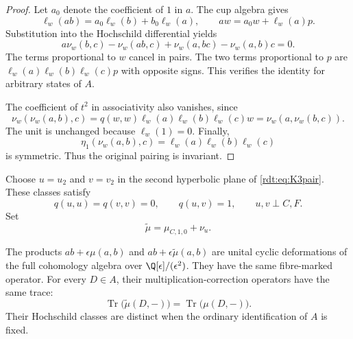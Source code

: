 \begin{proof}
Let $a_0$ denote the coefficient of $1$ in $a$.
The cup algebra gives
\[
 \ell_w(ab)=a_0\ell_w(b)+b_0\ell_w(a),
 \qquad
 aw=a_0w+\ell_w(a)p.
\]
Substitution into the Hochschild differential yields
\[
 a\nu_w(b,c)-\nu_w(ab,c)+\nu_w(a,bc)-\nu_w(a,b)c=0.
\]
The terms proportional to $w$ cancel in pairs.
The two terms proportional to $p$ are
$\ell_w(a)\ell_w(b)\ell_w(c)p$ with opposite signs.
This verifies the identity for arbitrary states of $A$.

The coefficient of $t^2$ in associativity also vanishes, since
\[
 \nu_w(\nu_w(a,b),c)
 =q(w,w)\ell_w(a)\ell_w(b)\ell_w(c)w
 =\nu_w(a,\nu_w(b,c)).
\]
The unit is unchanged because $\ell_w(1)=0$.
Finally,
\[
 \eta_1(\nu_w(a,b),c)=\ell_w(a)\ell_w(b)\ell_w(c)
\]
is symmetric. Thus the original pairing is invariant.
\end{proof}

Choose $u=u_2$ and $v=v_2$ in the second hyperbolic plane of
\eqref{rdt:eq:K3pair}. These classes satisfy
\[
 q(u,u)=q(v,v)=0,\qquad q(u,v)=1,\qquad
 u,v\perp C,F.
\]
Set
\[
 \widetilde\mu=\mu_{C,1,0}+\nu_u.
\]

\begin{proposition}\label{rdt:prop:traceinvisiblecubic}
The products $ab+\epsilon\mu(a,b)$ and
$ab+\epsilon\widetilde\mu(a,b)$ are unital cyclic deformations of
the full cohomology algebra over $\Q[\epsilon]/(\epsilon^2)$.
They have the same fibre-marked operator.
For every $D\in A$, their multiplication-correction operators
have the same trace:
\[
 \operatorname{Tr}\bigl(\widetilde\mu(D,-)\bigr)
   =\operatorname{Tr}\bigl(\mu(D,-)\bigr).
\]
Their Hochschild classes are distinct when the ordinary
identification of $A$ is fixed.
\end{proposition}

